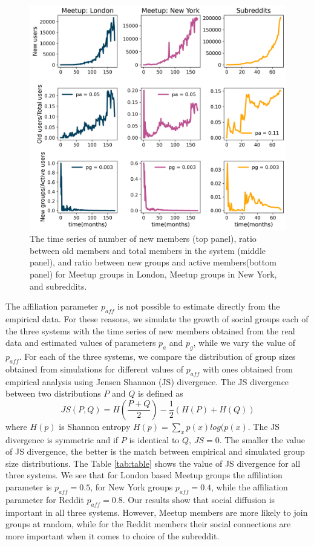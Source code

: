 \begin{figure}[h]
	\centering
	\includegraphics[width=0.8\linewidth]{Figures/figures/Fig3.png}
	\caption{The time series of number of new members (top panel), ratio between old members and total members in the system (middle panel), and ratio between new groups and active members(bottom panel) for Meetup groups in London,  Meetup groups in New York, and subreddits. }
	\label{fig:fig5}
\end{figure}

The affiliation parameter $p_{aff}$ is not possible to estimate directly from the empirical data. For these reasons, we simulate the growth of social groups each of the three systems with the time series of new members obtained from the real data and estimated values of parameters $p_a$ and $p_g$, while we vary the value of $p_{aff}$. For each of the three systems, we compare the distribution of group sizes obtained from simulations for different values of $p_{aff}$ with ones obtained from empirical analysis using Jensen Shannon (JS) divergence. The JS divergence \cite{jsdivergence} between two distributions $P$ and $Q$ is defined as 
\begin{equation}
JS(P, Q) = H\left(\frac{P+Q}{2}\right) - \frac{1}{2}\left(H(P)+H(Q)\right) \label{eq2}
\end{equation}
where $H(p)$ is Shannon entropy $H(p)=\sum_x p(x)log(p(x)$. The JS divergence is symmetric and if $P$ is identical to $Q$, $JS=0$. The smaller the value of JS divergence, the better is the match between empirical and simulated group size distributions. The Table \ref{tab:table} shows the value of JS divergence for all three systems. We see that for London based Meetup groups the affiliation parameter is $p_{aff}=0.5$, for New York groups $p_{aff}=0.4$, while the affiliation parameter for Reddit $p_{aff}=0.8$. Our results show that social diffusion is important in all three systems. However, Meetup members are more likely to join groups at random, while for the Reddit members their social connections are more important when it comes to choice of the subreddit.  


